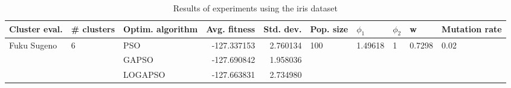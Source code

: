 \begin{table}
\centering
\caption{Results of experiments using the iris dataset}
\begin{tabular}{lllrrlllll}
\toprule
               Cluster eval. &        \# clusters & Optim. algorithm &  Avg. fitness &  Std. dev. &            Pop. size &               $\phi_{1}$ &         $\phi_{2}$ &                       w &         Mutation rate \\
\midrule
\multirow{3}{*}{Fuku Sugeno} & \multirow{3}{*}{6} &              PSO &   -127.337153 &   2.760134 & \multirow{3}{*}{100} & \multirow{3}{*}{1.49618} & \multirow{3}{*}{1} & \multirow{3}{*}{0.7298} & \multirow{3}{*}{0.02} \\
                             &                    &            GAPSO &   -127.690842 &   1.958036 &                      &                          &                    &                         &                       \\
                             &                    &          LOGAPSO &   -127.663831 &   2.734980 &                      &                          &                    &                         &                       \\
\bottomrule
\end{tabular}
\end{table}
